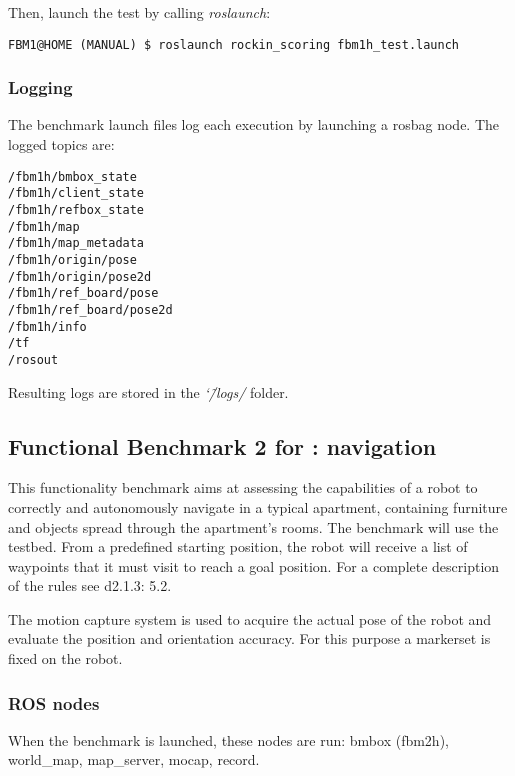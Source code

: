 \documentclass[a4paper]{article}
\newcommand{\logdir}{\char`\~/logs/}
\begin{document}
Then, launch the test by calling \emph{roslaunch}:
\begin{verbatim}
FBM1@HOME (MANUAL) $ roslaunch rockin_scoring fbm1h_test.launch
\end{verbatim}

\clearpage

\subsubsection{Logging}

The benchmark launch files log each execution by launching a rosbag node.
The logged topics are:

\begin{verbatim}
/fbm1h/bmbox_state
/fbm1h/client_state
/fbm1h/refbox_state
/fbm1h/map
/fbm1h/map_metadata
/fbm1h/origin/pose
/fbm1h/origin/pose2d
/fbm1h/ref_board/pose
/fbm1h/ref_board/pose2d
/fbm1h/info
/tf
/rosout
\end{verbatim}

Resulting logs are stored in the \emph{\logdir} folder.

\clearpage


\subsection{Functional Benchmark 2 for \ro@Home: navigation}
\label{sec:fbm2h}
This functionality benchmark aims at assessing the capabilities of a robot to correctly and autonomously navigate in a typical apartment, containing furniture and objects spread through the apartment’s rooms. The benchmark will use the \ro@Home testbed. From a predefined starting position, the robot will receive a list of waypoints that it must visit to reach a goal position.
For a complete description of the rules see d2.1.3: 5.2.

The motion capture system is used to acquire the actual pose of the robot and evaluate the position and orientation accuracy.
For this purpose a markerset is fixed on the robot.

\subsubsection{ROS nodes}

When the benchmark is launched, these nodes are run: bmbox (fbm2h), world\_map, map\_server, mocap, record.
\end{document}
